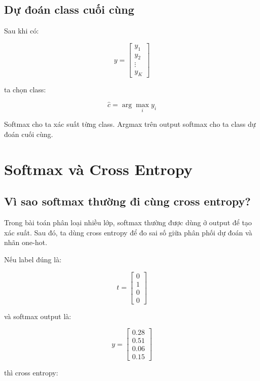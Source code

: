 \documentclass[12pt,a4paper]{report}
\begin{document}
\section{Dự đoán class cuối cùng}

Sau khi có:

\[
    y =
    \begin{bmatrix}
    y_1\\
    y_2\\
    \vdots\\
    y_K
    \end{bmatrix}
\]

ta chọn class:

\[
    \hat{c}
    =
    \arg\max_i y_i
\]

\begin{ghinho}
Softmax cho ta xác suất từng class. Argmax trên output softmax cho ta class dự đoán cuối cùng.
\end{ghinho}

\chapter{Softmax và Cross Entropy}

\section{Vì sao softmax thường đi cùng cross entropy?}

Trong bài toán phân loại nhiều lớp, softmax thường được dùng ở output để tạo xác suất. Sau đó, ta dùng cross entropy để đo sai số giữa phân phối dự đoán và nhãn one-hot.

Nếu label đúng là:

\[
    t =
    \begin{bmatrix}
    0\\
    1\\
    0\\
    0
    \end{bmatrix}
\]

và softmax output là:

\[
    y =
    \begin{bmatrix}
    0.28\\
    0.51\\
    0.06\\
    0.15
    \end{bmatrix}
\]

thì cross entropy:
\end{document}
